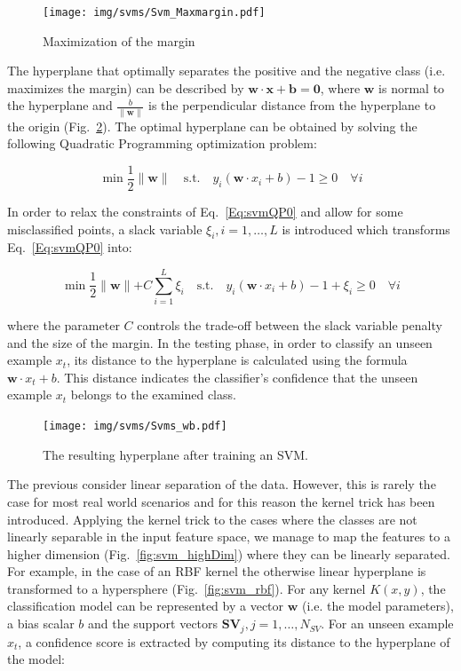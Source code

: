 \begin{figure}[h]
\centering
  \texttt{[image: img/svms/Svm\_Maxmargin.pdf]}
  \caption{Maximization of the margin}
  \label{fig:svm_margin}
\end{figure}

\noindent The hyperplane that optimally separates the positive and the
negative class (i.e. maximizes the margin) can be described by
$\mathbf{w\cdot x + b = 0}$, where $\mathbf{w}$ is normal to the
hyperplane and $\frac{b}{\parallel\mathbf{w}\parallel}$ is the
perpendicular distance from the hyperplane to the origin
(Fig.~\ref{fig:svm_wb}). The optimal hyperplane can be obtained by
solving the following Quadratic Programming optimization problem:

\begin{equation}\label{Eq:svmQP0}
  \min \frac{1}{2}\parallel\mathbf{w}\parallel \quad \text{s.t.} \quad y_i(\mathbf{w}\cdot x_i + b) -1 \ge 0 \quad \forall i
\end{equation}

In order to relax the constraints of Eq.~\ref{Eq:svmQP0} and allow for
some misclassified points, a slack variable $\xi_i, i=1,\ldots,L$ is
introduced which transforms Eq.~\ref{Eq:svmQP0} into:

\begin{equation}\label{Eq:svmQPxi}
  \min \frac{1}{2}\parallel\mathbf{w}\parallel + C\sum_{i=1}^{L}\xi_i \quad \text{s.t.} \quad y_i(\mathbf{w}\cdot x_i + b) -1 +\xi_i \ge 0 \quad \forall i
\end{equation}

\noindent where the parameter $C$ controls the trade-off between the
slack variable penalty and the size of the margin. In the testing
phase, in order to classify an unseen example $x_t$, its distance to
the hyperplane is calculated using the formula $\mathbf{w}\cdot x_t +
b$. This distance indicates the classifier's confidence that the
unseen example $x_t$ belongs to the examined class.

\begin{figure}[h]
\centering
  \texttt{[image: img/svms/Svms\_wb.pdf]}
  \caption{The resulting hyperplane after training an SVM.}
  \label{fig:svm_wb}
\end{figure}

The previous consider linear separation of the data. However, this is
rarely the case for most real world scenarios and for this reason the
kernel trick has been introduced. Applying the kernel trick to the
cases where the classes are not linearly separable in the input
feature space, we manage to map the features to a higher dimension
(Fig.~\ref{fig:svm_highDim}) where they can be linearly separated. For
example, in the case of an RBF kernel the otherwise linear hyperplane
is transformed to a hypersphere (Fig.~\ref{fig:svm_rbf}). For any
kernel $K(x,y)$, the classification model can be represented by a
vector $\textbf{w}$ (i.e. the model parameters), a bias scalar $b$ and
the support vectors $\mathbf{SV}_j, j=1,\ldots,N_{SV}$. For an unseen
example $x_t$, a confidence score is extracted by computing its
distance to the hyperplane of the model:

